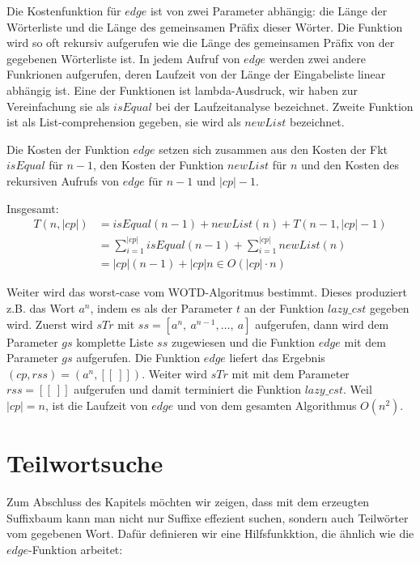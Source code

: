 \documentclass[12pt]{report}
\newcommand{\abs}[1]{\left|#1\right|}
\begin{document}
Die Kostenfunktion für $edge$ ist von zwei Parameter abhängig: die Länge der Wörterliste und die Länge des gemeinsamen Präfix dieser Wörter. Die Funktion wird so oft rekursiv aufgerufen wie die Länge des gemeinsamen Präfix von der gegebenen Wörterliste ist. In jedem Aufruf von $edge$ werden zwei andere Funkrionen aufgerufen, deren Laufzeit von der Länge der Eingabeliste linear abhängig ist. Eine der Funktionen ist lambda-Ausdruck, wir haben zur Vereinfachung sie als $isEqual$ bei der Laufzeitanalyse bezeichnet. Zweite Funktion ist als List-comprehension gegeben, sie wird als $newList$ bezeichnet.

Die Kosten der Funktion $edge$ setzen sich zusammen aus den Kosten der Fkt $isEqual$ für $n - 1$, den Kosten der Funktion $newList$ für $n$ und den Kosten des rekursiven Aufrufs von $edge$ für $n - 1$ und $\abs{cp} - 1$.

Insgesamt:
\begin{align*}
    T(n,\abs{cp}) &= isEqual(n - 1) + newList(n) + T(n-1,\abs{cp}-1) \\
                  &= \sum_{i = 1}^{\abs{cp}}{isEqual(n-1)} + \sum_{i = 1}^{\abs{cp}}{newList(n)}\\
                  &= \abs{cp} (n - 1) + \abs{cp} n \in O(\abs{cp} \cdot n)
\end{align*}

Weiter wird das worst-case vom WOTD-Algoritmus bestimmt. Dieses produziert z.B. das Wort $a^n$, indem es als der Parameter $t$ an der Funktion $lazy\_cst$ gegeben wird. Zuerst wird $sTr$ mit $ss = [a^n,\:a^{n-1}, \dots ,\:a]$ aufgerufen, dann wird dem Parameter $gs$ komplette Liste $ss$ zugewiesen und die Funktion $edge$ mit dem Parameter $gs$ aufgerufen. Die Funktion $edge$ liefert das Ergebnis $(cp,rss) = (a^n, [[\:]])$. Weiter wird $sTr$ mit mit dem Parameter $rss = [[\:]]$ aufgerufen und damit terminiert die Funktion $lazy\_cst$. Weil $|cp| = n$, ist die Laufzeit von $edge$ und von dem gesamten Algorithmus $O(n^2)$.

\section{Teilwortsuche}
\label{sec:Teilwortsuche}

Zum Abschluss des Kapitels möchten wir zeigen, dass mit dem erzeugten Suffixbaum kann man nicht nur Suffixe effezient suchen, sondern auch Teilwörter vom gegebenen Wort. Dafür definieren wir eine Hilfsfunkktion, die ähnlich wie die $edge$-Funktion arbeitet:
\end{document}
